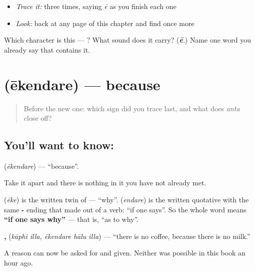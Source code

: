 \begin{itemize}
\raggedright
  \item \emph{Trace it:}  three times, saying \emph{ē} as you finish each one
  \item \emph{Look:} back at any page of this chapter and find  once more
\end{itemize}

\begin{tcolorbox}[breakable,colback=teal!4,colframe=teal!35!black,title={Before you move on}]
Which character is this — ? What sound does it carry? (\emph{\textbf{ē}}.) Name one word you already say that contains it.
\end{tcolorbox}
\section[\texorpdfstring{\kn{ಏಕೆಂದರೆ} (ēkendare)}{ಏಕೆಂದರೆ (ēkendare)}]{ (ēkendare) — because}

\label{lesson:KA-C70-because}



\begin{quote}
Before the new one: which sign did you trace last, and what does \emph{anta} close off?
\end{quote}

\subsection*{You'll want to know: }
\textbf{} (\emph{ēkendare}) — \textquotedblleft{}because\textquotedblright{}.

Take it apart and there is nothing in it you have not already met.

 (\emph{ēke}) is the written twin of  — \textquotedblleft{}why\textquotedblright{}.  (\emph{endare}) is the written quotative  with the same \textbf{-} ending that made  out of a verb: \textquotedblleft{}if one says\textquotedblright{}. So the whole word means \textbf{\textquotedblleft{}if one says why\textquotedblright{}} — that is, \textquotedblleft{}as to why\textquotedblright{}.

\textbf{ ,   } (\emph{kāphi illa, ēkendare hālu illa}) — \textquotedblleft{}there is no coffee, because there is no milk.\textquotedblright{}

A reason can now be asked for and given. Neither was possible in this book an hour ago.

